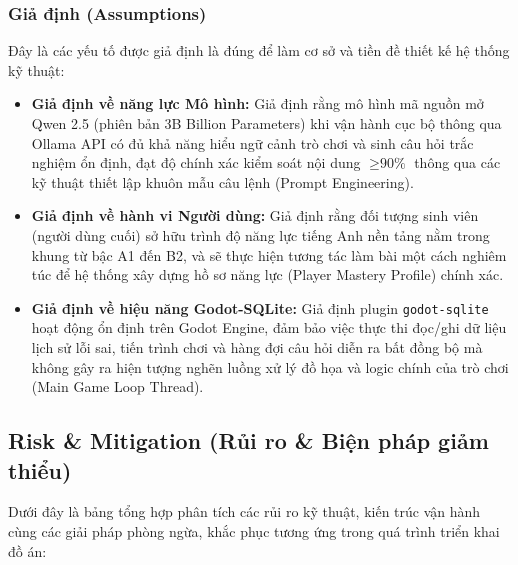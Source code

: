 \subsubsection{Giả định (Assumptions)}
Đây là các yếu tố được giả định là đúng để làm cơ sở và tiền đề thiết kế hệ thống kỹ thuật:
\begin{itemize}
    \item \textbf{Giả định về năng lực Mô hình:} Giả định rằng mô hình mã nguồn mở Qwen 2.5 (phiên bản 3B Billion Parameters) khi vận hành cục bộ thông qua Ollama API có đủ khả năng hiểu ngữ cảnh trò chơi và sinh câu hỏi trắc nghiệm ổn định, đạt độ chính xác kiểm soát nội dung $\ge \text{90\%}$ thông qua các kỹ thuật thiết lập khuôn mẫu câu lệnh (Prompt Engineering).
    \item \textbf{Giả định về hành vi Người dùng:} Giả định rằng đối tượng sinh viên (người dùng cuối) sở hữu trình độ năng lực tiếng Anh nền tảng nằm trong khung từ bậc A1 đến B2, và sẽ thực hiện tương tác làm bài một cách nghiêm túc để hệ thống xây dựng hồ sơ năng lực (Player Mastery Profile) chính xác.
    \item \textbf{Giả định về hiệu năng Godot-SQLite:} Giả định plugin \texttt{godot-sqlite} hoạt động ổn định trên Godot Engine, đảm bảo việc thực thi đọc/ghi dữ liệu lịch sử lỗi sai, tiến trình chơi và hàng đợi câu hỏi diễn ra bất đồng bộ mà không gây ra hiện tượng nghẽn luồng xử lý đồ họa và logic chính của trò chơi (Main Game Loop Thread).
\end{itemize}



\subsection{Risk \& Mitigation (Rủi ro \& Biện pháp giảm thiểu)}
Dưới đây là bảng tổng hợp phân tích các rủi ro kỹ thuật, kiến trúc vận hành cùng các giải pháp phòng ngừa, khắc phục tương ứng trong quá trình triển khai đồ án:

